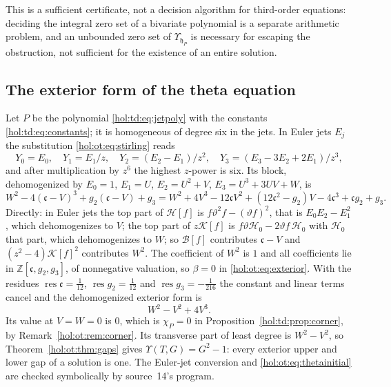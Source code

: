 \documentclass[11pt]{article}
\numberwithin{equation}{section}
\theoremstyle{definition}
\theoremstyle{remark}
\newcommand{\Z}{\mathbb Z}
\newcommand{\res}{\operatorname{res}}
\begin{document}
This is a sufficient certificate, not a decision algorithm for third-order
equations: deciding the integral zero set of a bivariate polynomial is a
separate arithmetic problem, and an unbounded zero set of
$\Upsilon_{\mathfrak h_P}$ is necessary for escaping the obstruction, not
sufficient for the existence of an entire solution.

\subsection{The exterior form of the theta equation}
\label{hol:ot:sub:thetaform}

Let $P$ be the polynomial \eqref{hol:td:eq:jetpoly} with the constants
\eqref{hol:td:eq:constants}; it is homogeneous of degree six in the jets. In
Euler jets $E_j$ the substitution \eqref{hol:ot:eq:stirling} reads
\begin{equation}\label{hol:ot:eq:eulersub}
 Y_0=E_0,\quad Y_1=E_1/z,\quad Y_2=(E_2-E_1)/z^2,\quad
 Y_3=(E_3-3E_2+2E_1)/z^3 ,
\end{equation}
and after multiplication by $z^6$ the highest $z$-power is six. Its block,
dehomogenized by $E_0=1$, $E_1=U$, $E_2=U^2+V$, $E_3=U^3+3UV+W$, is
\begin{equation}\label{hol:ot:eq:thetatop}
 W^2-4(\mathfrak c-V)^3+g_2(\mathfrak c-V)+g_3
 =W^2+4V^3-12\mathfrak cV^2+(12\mathfrak c^2-g_2)V-4\mathfrak c^3
 +\mathfrak cg_2+g_3 .
\end{equation}
Directly: in Euler jets the top part of $\mathcal H[f]$ is
$f\vartheta^2f-(\vartheta f)^2$, that is $E_0E_2-E_1^2$, which dehomogenizes to
$V$; the top part of $z\mathcal K[f]$ is
$f\vartheta\mathcal H_0-2\vartheta f\,\mathcal H_0$ with $\mathcal H_0$ that
part, which dehomogenizes to $W$; so $\mathcal B[f]$ contributes
$\mathfrak c-V$ and $(z^2-4)\mathcal K[f]^2$ contributes $W^2$. The
coefficient of
$W^2$ is $1$ and all coefficients lie in $\Z[\mathfrak c,g_2,g_3]$, of
nonnegative valuation, so $\beta=0$ in \eqref{hol:ot:eq:exterior}. With the
residues $\res\mathfrak c=\frac1{12}$, $\res g_2=\frac1{12}$ and
$\res g_3=-\frac1{216}$ the constant and linear terms cancel and the
dehomogenized exterior form is
\begin{equation}\label{hol:ot:eq:thetainitial}
 W^2-V^2+4V^3 .
\end{equation}
Its value at $V=W=0$ is $0$, which is $\chi_P=0$ in
Proposition~\ref{hol:td:prop:corner}, by Remark~\ref{hol:ot:rem:corner}. Its
transverse part of least degree is $W^2-V^2$, so
Theorem~\ref{hol:ot:thm:gaps} gives $\Upsilon(T,G)=G^2-1$: every exterior upper
and lower gap of a solution is one. The Euler-jet conversion and
\eqref{hol:ot:eq:thetainitial} are checked symbolically by source~14's
program.
\end{document}
